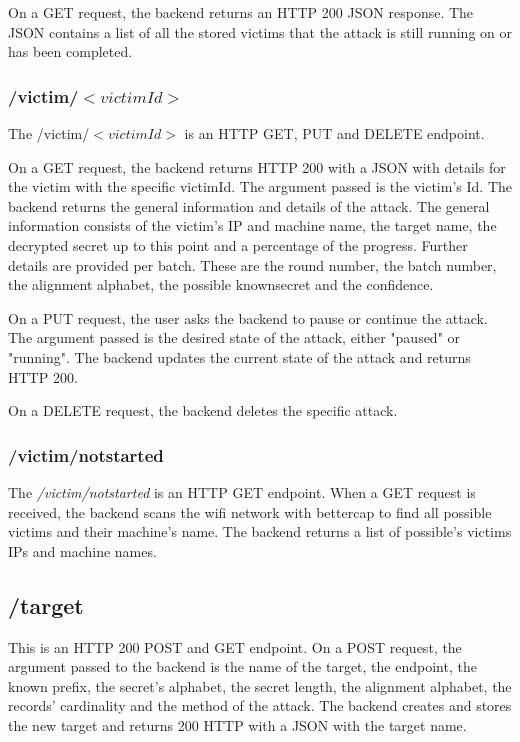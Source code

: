 \documentclass[a4paper, 11 pt, conference]{article}
\begin{document}
On a GET request, the backend returns an HTTP 200 JSON response. The JSON contains a list of all the stored victims that the attack is still running on or has been completed.

\subsubsection{/victim/$ <victimId> $}

The /victim/$ <victimId> $ is an HTTP GET, PUT and DELETE endpoint.

On a GET request, the backend returns HTTP 200 with a JSON with details for the victim with the specific victimId. The argument passed is the victim's Id. The backend returns the general information and details of the attack. The general information consists of the victim's IP and machine name, the target name, the decrypted secret up to this point and a percentage of the progress. Further details are provided per  batch. These are the round number, the batch number, the alignment alphabet, the possible knownsecret and the confidence.

On a PUT request, the user asks the backend to pause or continue the attack. The argument passed is the desired state of the attack, either "paused" or "running". The backend updates the current state of the attack and returns HTTP 200.

On a DELETE request, the backend deletes the specific attack.

\subsubsection{/victim/notstarted}

The \textit{/victim/notstarted} is an HTTP GET endpoint. When a GET request is received, the backend scans the wifi network with bettercap to find all possible victims and their machine's name. The backend returns a list of possible's victims IPs and machine names.


\subsection{/target}
This is an HTTP 200 POST and GET endpoint.
On a POST request, the argument passed to the backend is the name of the target, the endpoint, the known prefix, the secret's alphabet, the secret length, the alignment alphabet, the records' cardinality and the method of the attack. The backend creates and stores the new target and returns 200 HTTP with a JSON with the target name.
\end{document}

